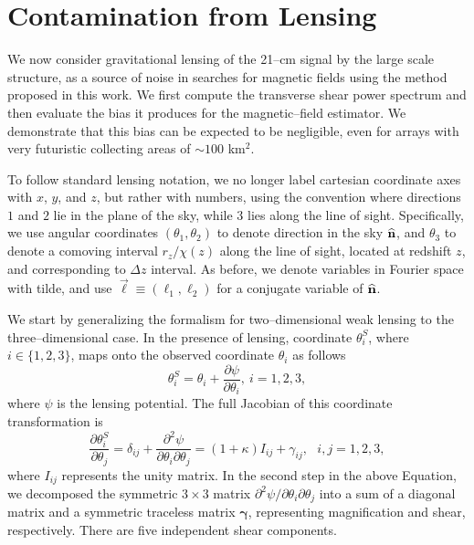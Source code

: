 \section{Contamination from Lensing}

We now consider gravitational lensing of the 21--cm signal by the large scale structure, as a source of noise in searches for magnetic fields using the method proposed in this work. We first compute the transverse shear power spectrum and then evaluate the bias it produces for the magnetic--field estimator. We demonstrate that this bias can be expected to be negligible, even for arrays with very futuristic collecting areas of $\sim 100$ km$^2$.

To follow standard lensing notation, we no longer label cartesian coordinate axes with $x$, $y$, and $z$, but rather with numbers, using the convention where directions $1$ and $2$ lie in the plane of the sky, while $3$ lies along the line of sight. Specifically, we use angular coordinates $(\theta_1, \theta_2)$ to denote direction in the sky ${\bf{\widehat n}}$, and $\theta_3$ to denote a comoving interval $r_z/\chi(z)$ along the line of sight, located at redshift $z$, and corresponding to $\Delta z$ interval. As before, we denote variables in Fourier space with tilde, and use $\vec{\ell}\equiv(\ell_1,\ell_2)$ for a conjugate variable of ${\bf{\widehat n}}$. 
 
We start by generalizing the formalism for two--dimensional weak lensing \cite{Weinberg201387} to the three--dimensional case.
In the presence of lensing, coordinate $\theta_i^S$, where $i\in\{1,2,3\}$, maps onto the observed coordinate $\theta_i$ as follows \begin{equation}
\theta_i^S=\theta_i+\frac{\partial\psi}{\partial\theta_i},\ i=1,2,3,
\label{eq:lensingmapping}
\end{equation}
where $\psi$ is the lensing potential. The full Jacobian of this coordinate transformation is
\begin{equation}
\frac{\partial\theta_i^S}{\partial\theta_j}=\delta_{ij}+\frac{\partial^2\psi}{\partial\theta_i\partial\theta_j}=(1+\kappa)I_{ij}+\gamma_{ij},\ \ \ i,j=1,2,3,
\label{eq:lensingtsf}
\end{equation}
where $I_{ij}$ represents the unity matrix. In the second step in the above Equation, we decomposed the symmetric $3\times 3$ matrix $\partial^2\psi/\partial\theta_i\partial\theta_j$ into a sum of a diagonal matrix and a symmetric traceless matrix $\bm{\gamma}$, representing magnification and shear, respectively. There are five independent shear components.

